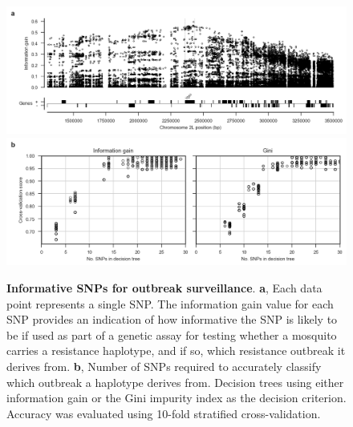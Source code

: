 \documentclass[a4paper,11pt,abstracton]{scrartcl}
\begin{document}
%
\begin{figure}[!b]
  \centering
  
  \includegraphics[width=1.0\linewidth]{artwork/info_gain.png}
  \includegraphics[width=1.0\linewidth]{artwork/tree_cv.png}
  
  \caption{%
%
\textbf{Informative SNPs for outbreak surveillance}. 
%
\textbf{a}, Each data point represents a single SNP. 
%
The information gain value for each SNP provides an indication of how informative the SNP is likely to be if used as part of a genetic assay for testing whether a mosquito carries a resistance haplotype, and if so, which resistance outbreak it derives from. 
%
\textbf{b}, Number of SNPs required to accurately classify which outbreak a haplotype derives from. 
%
Decision trees using either information gain or the Gini impurity index as the decision criterion.
%
Accuracy was evaluated using 10-fold stratified cross-validation.
}

  \label{fig:gain}
\end{figure}
\end{document}
